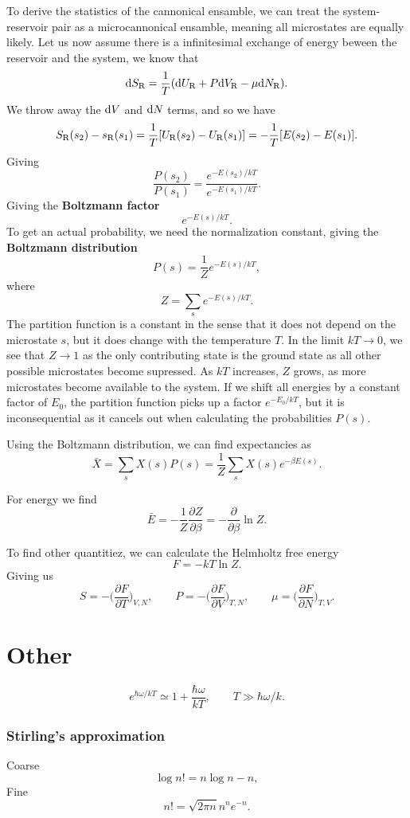 \documentclass[a4paper, 11pt, notitlepage, english]{article}
\renewcommand{\d}{{\rm d}}
\newcommand{\p}{\partial}
\begin{document}
To derive the statistics of the cannonical ensamble, we can treat the system-reservoir pair as a microcannonical ensamble, meaning all microstates are equally likely. Let us now assume there is a infinitesimal exchange of energy beween the reservoir and the system, we know that
$$\d S_{\rm R} = \frac{1}{T}(\d U_{\rm R} + P \d V_{\rm R} - \mu \d N_{\rm R}).$$
We throw away the $\d V$ and $\d N$ terms, and so we have
$$S_{\rm R}(s_2) - s_{\rm R}(s_1) = \frac{1}{T}[U_{\rm R}(s_2) - U_{\rm R}(s_1)] = -\frac{1}{T}[E(s_2) - E(s_1)].$$
Giving
$$\frac{P(s_2)}{P(s_1)} = \frac{e^{-E(s_2)/kT}}{e^{-E(s_1)/kT}}.$$
Giving the \textbf{Boltzmann factor}
$$e ^{-E(s)/kT}.$$
To get an actual probability, we need the normalization constant, giving the \textbf{Boltzmann distribution}
$$P(s) = \frac{1}{Z}e^{-E(s)/kT},$$
where 
$$Z = \sum_s e^{-E(s)/kT}.$$
The partition function is a constant in the sense that it does not depend on the microstate $s$, but it does change with the temperature $T$. In the limit $kT \to 0$, we see that $Z \to 1$ as the only contributing state is the ground state as all other possible microstates become supressed. As $kT$ increases, $Z$ grows, as more microstates become available to the system. If we shift all energies by a constant factor of $E_0$, the partition function picks up a factor $e^{-E_0/kT}$, but it is inconsequential as it cancels out when calculating the probabilities $P(s)$.

Using the Boltzmann distribution, we can find expectancies as
$$\bar{X} = \sum_s X(s) P(s) = \frac{1}{Z} \sum_s X(s) e^{-\beta E(s)}.$$

For energy we find
$$\bar{E} = - \frac{1}{Z}\frac{\p Z}{\p \beta} = -\frac{\p}{\p \beta}\ln Z.$$

To find other quantitiez, we can calculate the Helmholtz free energy
$$F = -kT \ln Z.$$
Giving us
$$S = -\bigg(\frac{\p F}{\p T}\bigg)_{V, N}, \qquad P = -\bigg(\frac{\p F}{\p V}\bigg)_{T, N}, \qquad \mu = \bigg(\frac{\p F}{\p N}\bigg)_{T, V}.$$

\clearpage

\section*{Other}

$$e^{\hbar\omega/kT} \simeq 1 + \frac{\hbar \omega}{kT}, \qquad T \gg \hbar\omega/k.$$

\subsubsection*{Stirling's approximation}
Coarse
$$\log n! = n \log n - n,$$
Fine
$$n! = \sqrt{2\pi n} n^n e^{-n}.$$
\end{document}
